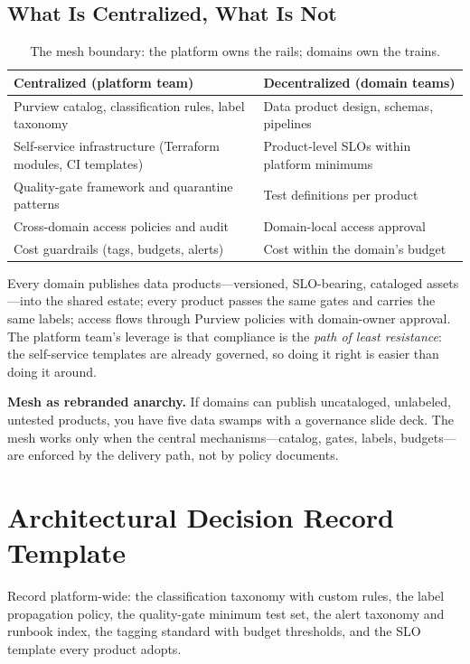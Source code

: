 \subsection{What Is Centralized, What Is Not}
\begin{table}[H]
\centering
\small
\begin{tabular}{@{}p{5.2cm}p{7.6cm}@{}}
\toprule
\textbf{Centralized (platform team)} & \textbf{Decentralized (domain teams)} \\
\midrule
Purview catalog, classification rules, label taxonomy & Data product design, schemas, pipelines \\
Self-service infrastructure (Terraform modules, CI templates) & Product-level SLOs within platform minimums \\
Quality-gate framework and quarantine patterns & Test definitions per product \\
Cross-domain access policies and audit & Domain-local access approval \\
Cost guardrails (tags, budgets, alerts) & Cost within the domain's budget \\
\bottomrule
\end{tabular}
\caption{The mesh boundary: the platform owns the rails; domains own the trains.}
\label{tab:ch22-mesh}
\end{table}

Every domain publishes data products---versioned, SLO-bearing, cataloged assets---into the shared estate; every product passes the same gates and carries the same labels; access flows through Purview policies with domain-owner approval. The platform team's leverage is that compliance is the \emph{path of least resistance}: the self-service templates are already governed, so doing it right is easier than doing it around.

\begin{pitfall}
\textbf{Mesh as rebranded anarchy.} If domains can publish uncataloged, unlabeled, untested products, you have five data swamps with a governance slide deck. The mesh works only when the central mechanisms---catalog, gates, labels, budgets---are enforced by the delivery path, not by policy documents.
\end{pitfall}

\section{Architectural Decision Record Template}
Record platform-wide: the classification taxonomy with custom rules, the label propagation policy, the quality-gate minimum test set, the alert taxonomy and runbook index, the tagging standard with budget thresholds, and the SLO template every product adopts.

